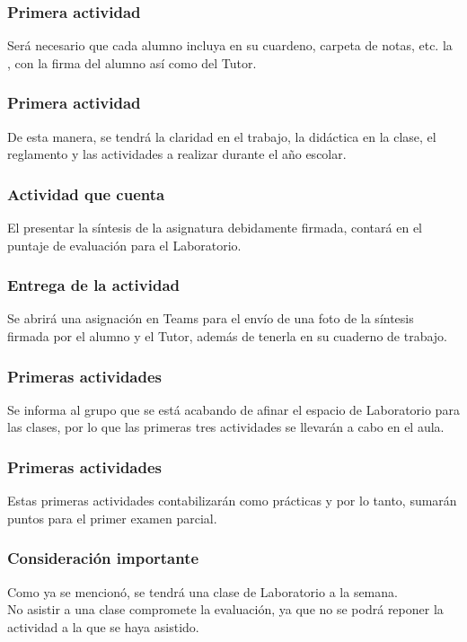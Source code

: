 \documentclass[14pt]{beamer}
\begin{document}
\begin{frame}
\frametitle{Primera actividad}
Será necesario que cada alumno incluya en su cuardeno, carpeta de notas, etc. la , con la firma del alumno así como del Tutor.
\end{frame}
\begin{frame}
\frametitle{Primera actividad}
De esta manera, se tendrá la claridad en el trabajo, la didáctica en la clase, el reglamento y las actividades a realizar durante el año escolar.
\end{frame}
\begin{frame}
\frametitle{Actividad que cuenta}
El presentar la síntesis de la asignatura debidamente firmada, contará en el puntaje de evaluación para el Laboratorio.
\end{frame}
\begin{frame}
\frametitle{Entrega de la actividad}
Se abrirá una asignación en Teams para el envío de una foto de la síntesis firmada por el alumno y el Tutor, además de tenerla en su cuaderno de trabajo.
\end{frame}
\begin{frame}
\frametitle{Primeras actividades}
Se informa al grupo que se está acabando de afinar el espacio de Laboratorio para las clases, \pause por lo que las primeras tres actividades se llevarán a cabo en el aula.
\end{frame}
\begin{frame}
\frametitle{Primeras actividades}
Estas primeras actividades contabilizarán como prácticas y por lo tanto, sumarán puntos para el primer examen parcial.
\end{frame}
\begin{frame}
\frametitle{Consideración importante}
Como ya se mencionó, se tendrá una clase de Laboratorio a la semana.
\\
\bigskip
\pause
No asistir a una clase compromete la evaluación, ya que no se podrá reponer la actividad a la que se haya asistido.
\end{frame}
\end{document}
